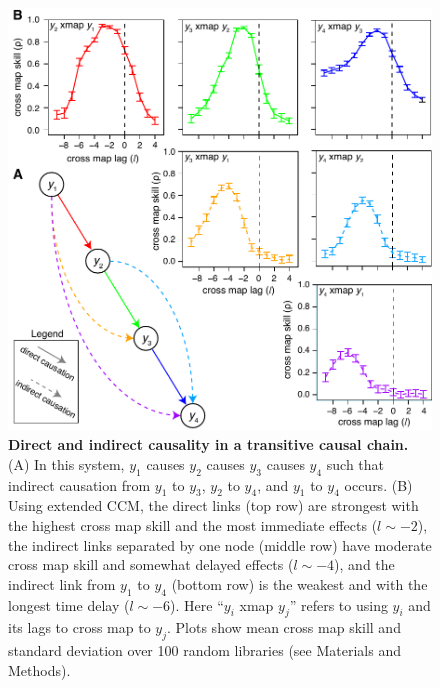 \begin{figure}[!ht]
\begin{center}\includegraphics[width=\maxwidth{\textwidth}]{fig_lag_4sp_transitive.pdf}\end{center}
\caption[Direct and indirect causality in a transitive causal chain.]{\textbf{Direct and indirect causality in a transitive causal chain.}\newline
(A) In this system, $y_1$ causes $y_2$ causes $y_3$ causes $y_4$ such that indirect causation from $y_1$ to $y_3$, $y_2$ to $y_4$, and $y_1$ to $y_4$ occurs. (B) Using extended CCM, the direct links (top row) are strongest with the highest cross map skill and the most immediate effects ($l \sim -2$), the indirect links separated by one node (middle row) have moderate cross map skill and somewhat delayed effects ($l \sim -4$), and the indirect link from $y_1$ to $y_4$ (bottom row) is the weakest and with the longest time delay ($l \sim -6$). Here ``$y_i$ xmap $y_j$'' refers to using $y_i$ and its lags to cross map to $y_j$. Plots show mean cross map skill and standard deviation over 100 random libraries (see Materials and Methods).}
\label{fig_lag_4sp_transitive}
\end{figure}

